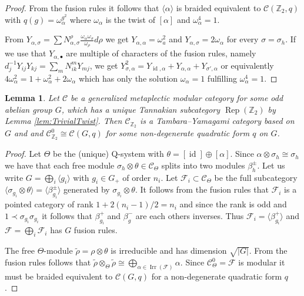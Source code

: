 \documentclass[twoside,11pt,reqno]{amsart}
\newtheorem{lem}[thm]{Lemma}
\theoremstyle{definition}
\theoremstyle{remark}
\newcommand{\cF}{\mathcal{F}}
\newcommand{\cC}{\mathcal{C}}
\newcommand{\ZZ}{\mathbb{Z}}
\DeclareMathOperator{\Rep}{Rep}
\DeclareMathOperator{\id}{id}
\DeclareMathOperator{\Irr}{Irr}
\begin{document}
\begin{proof}
%
  From the fusion rules it follows that $\langle \alpha\rangle$ is 
  braided equivalent to $\cC(\ZZ_2,q)$ with $q(g)=\omega_\alpha^{g^2}$ 
  where $\omega_\alpha$ is the twist of $[\alpha]$ and $\omega_\alpha^4=1$.



%
%

  From $Y_{\alpha,\sigma}
    =\sum N_{\alpha,\sigma}^\rho \frac{\omega_\alpha\omega_\sigma}{\omega_\rho}
    d\rho$
  we get $Y_{\alpha,\alpha}=\omega_a^2$ and $Y_{\alpha,\sigma}=2\omega_\alpha$ 
  for every $\sigma=\sigma_h$.
%
  If we use that $Y_{\alpha,\bullet}$ are multiple of characters \cite{Re1989} 
  of the fusion rules, namely  $d_j^{-1}Y_{ij}Y_{kj}=\sum_m N_{ik}^m Y_{mj}$, 
  we get 
  $Y_{\sigma,\alpha}^2=Y_{\id,\alpha}+Y_{\alpha,\alpha}+Y_{\sigma',\alpha}$ 
  or equivalently 
  $4\omega_\alpha^2=1+\omega_\alpha^2+2\omega_\alpha$
%
  which has only the solution $\omega_\alpha=1$ fulfilling $\omega_\alpha^4=1$.
%
%
%
%
%
\end{proof}

\begin{lem}
  \label{lem:MPdeequivariantizationisTY}
  Let $\cC$ be a generalized metaplectic modular category for some odd abelian 
  group $G$, which has a unique Tannakian subcategory $\Rep(\ZZ_2)$ by 
  Lemma  \ref{lem:TrivialTwist}.
  Then $\cC_{\ZZ_2}$ is a Tambara--Yamagami category based on $G$ and 
  and $\cC_{\ZZ_2}^0\cong \cC(G, q)$ for some non-degenerate quadratic form 
  $q$ on $G$.
%
%
%
%
\end{lem}
\begin{proof}
  Let $\Theta$ be the (unique) Q-system with $\theta=[\id]\oplus [\alpha]$.
  Since $\alpha\otimes \sigma_h\cong\sigma_h$ we have that each free module 
  $\sigma_{h}\otimes \theta\in \cC_\Theta$ splits into two modules 
  $\beta_{ h}^\pm$.
  Let us write $G=\bigoplus_i \langle g_i \rangle$ with $g_i \in G_+$ of order 
  $n_i$. 
  Let $\cF_i\subset \cC_\Theta$ be the full subcategory 
  $\langle  \sigma_{g_i}\otimes\theta\rangle = \langle\beta_{g_i}^\pm\rangle$
  generated by $\sigma_{g_i}\otimes\theta$.
  It follows from the fusion rules that $\cF_i$ is a pointed category of rank 
  $1+2(n_i-1)/2=n_i$ and since the rank is odd and 
  $1 \prec \sigma_{g_i}\sigma_{g_i}$ it follows that  
  $\beta^+_{g_i}$ and  $\beta^-_{g}$ are each others inverses. 
  Thus $\cF_i=\langle \beta^+_{g_i}\rangle$ and $\cF=\bigoplus_i\cF_i$ has 
  $G$ fusion rules.
 
%
%
%
%
%
  
  
  The free $\Theta$-module $\tilde \rho=\rho\otimes \theta$ is irreducible and
  has dimension $\sqrt{|G|}$.
  From the fusion rules follows that
  $\tilde\rho\otimes_\Theta\tilde\rho\cong\bigoplus_{\alpha\in\Irr(\cF)} \alpha$.
  Since $\cC_\Theta^0=\cF$ is modular it must be braided equivalent to 
  $\cC(G,q)$ for a non-degenerate quadratic form $q$. 
\end{proof}
\end{document}
